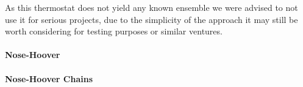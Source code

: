 As this thermostat does not yield any known ensemble we were advised to not use it for serious projects, due to the simplicity of the approach it may still be worth considering for testing purposes or similar ventures.


\paragraph{Nose-Hoover}
\paragraph{Nose-Hoover Chains}


